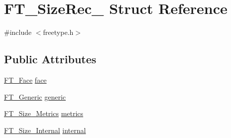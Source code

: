 \hypertarget{struct_f_t___size_rec__}{\section{F\-T\-\_\-\-Size\-Rec\-\_\- Struct Reference}
\label{struct_f_t___size_rec__}
}


{\ttfamily \#include $<$freetype.\-h$>$}

\subsection*{Public Attributes}
\begin{DoxyCompactItemize}
\item 
\hyperlink{freetype_8h_a7eba045ee20968354fa1bff0f69740fa}{F\-T\-\_\-\-Face} \hyperlink{struct_f_t___size_rec___a21b54fb07feaba8be23321054da98f5f}{face}
\item 
\hyperlink{fttypes_8h_ae15e8550dd7d863328686aadaead5c77}{F\-T\-\_\-\-Generic} \hyperlink{struct_f_t___size_rec___aa24520b093a9b4ba9ff388bfe7b9491d}{generic}
\item 
\hyperlink{freetype_8h_a8b7a8201f8d155cac76cfb03302c2672}{F\-T\-\_\-\-Size\-\_\-\-Metrics} \hyperlink{struct_f_t___size_rec___a29a6b518d09f6cf1714d9aed01eddc01}{metrics}
\item 
\hyperlink{freetype_8h_a59c5fa003a18285aab769cb96252499c}{F\-T\-\_\-\-Size\-\_\-\-Internal} \hyperlink{struct_f_t___size_rec___a236c47ea3138e485c29b0d7baa5cf3b6}{internal}
\end{DoxyCompactItemize}



